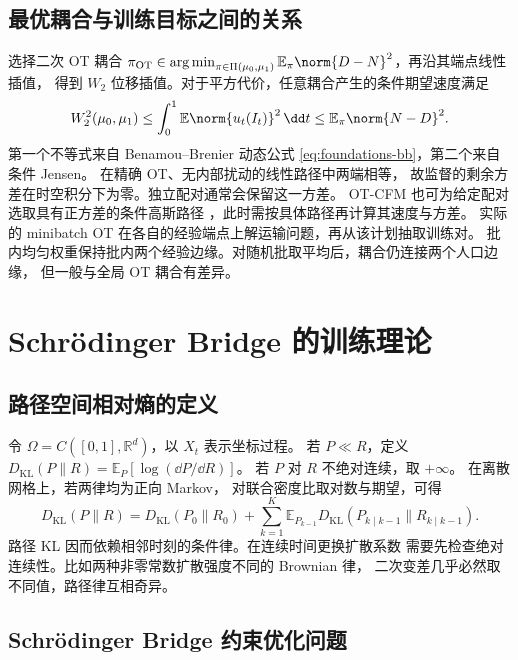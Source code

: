 \subsection{最优耦合与训练目标之间的关系}

选择二次 OT 耦合
\(\pi_{\mathrm{OT}}\in\operatorname*{arg\,min}_{\pi\in\Pi(\mu_0,\mu_1)}
\mathbb E_\pi\norm{D-N}^2\)，再沿其端点线性插值，
得到 \(W_2\) 位移插值。对于平方代价，任意耦合产生的条件期望速度满足
\[
  W_2^2(\mu_0,\mu_1)
  \le\int_0^1\mathbb E\norm{u_t(I_t)}^2\,\dd t
  \le\mathbb E_\pi\norm{N-D}^2 .
\]
第一个不等式来自 Benamou--Brenier 动态公式
\eqref{eq:foundations-bb}，第二个来自条件 Jensen。
在精确 OT、无内部扰动的线性路径中两端相等，
故监督的剩余方差在时空积分下为零。独立配对通常会保留这一方差。
OT-CFM 也可为给定配对选取具有正方差的条件高斯路径
\cite{tong2024otcfm}，此时需按具体路径再计算其速度与方差。
实际的 minibatch OT 在各自的经验端点上解运输问题，再从该计划抽取训练对。
批内均匀权重保持批内两个经验边缘。对随机批取平均后，耦合仍连接两个人口边缘，
但一般与全局 OT 耦合有差异。

\pagebreak
\section{Schrödinger Bridge 的训练理论}
\label{sec:training-sb}

\subsection{路径空间相对熵的定义}

令 \(\Omega=C([0,1],\mathbb R^d)\)，以 \(X_t\) 表示坐标过程。
若 \(P\ll R\)，定义
\(D_{\mathrm{KL}}(P\|R)=\mathbb E_P[\log(\dd P/\dd R)]\)。
若 \(P\) 对 \(R\) 不绝对连续，取 \(+\infty\)。
在离散网格上，若两律均为正向 Markov，
对联合密度比取对数与期望，可得
\[
  D_{\mathrm{KL}}(P\|R)
  =D_{\mathrm{KL}}(P_0\|R_0)+
    \sum_{k=1}^K\mathbb E_{P_{k-1}}
           D_{\mathrm{KL}}(P_{k\mid k-1}\|R_{k\mid k-1}).
\]
路径 KL 因而依赖相邻时刻的条件律。在连续时间更换扩散系数
需要先检查绝对连续性。比如两种非零常数扩散强度不同的 Brownian 律，
二次变差几乎必然取不同值，路径律互相奇异。

\subsection{Schrödinger Bridge 约束优化问题}

